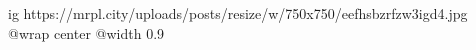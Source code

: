  
 
 
 
 

\ifcmt
  ig https://mrpl.city/uploads/posts/resize/w/750x750/eefhsbzrfzw3igd4.jpg
  @wrap center
  @width 0.9
\fi
